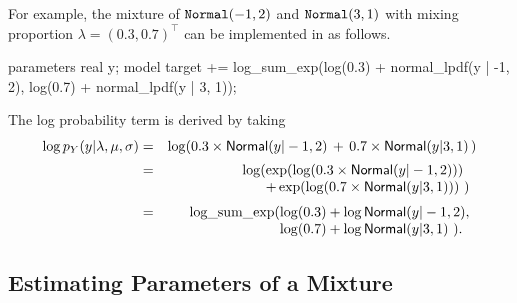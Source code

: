 For example, the mixture of $\code{Normal}(-1,2)$ and
$\code{Normal}(3,1)$ with mixing proportion $\lambda =
(0.3,0.7)^{\top}$ can be implemented in \Stan as follows.
%
\begin{stancode}
parameters {
  real y;
}
model {
  target += log_sum_exp(log(0.3) + normal_lpdf(y | -1, 2),
                        log(0.7) + normal_lpdf(y | 3, 1));
}
\end{stancode}
%
The log probability term is derived by taking
%
\begin{eqnarray*}
\log p_Y(y | \lambda,\mu,\sigma) & = & \log\!\left( 0.3 \times \distro{Normal}(y|-1,2) \, + \,
  0.7 \times
  \distro{Normal}(y|3,1) \, \right)
\\[2pt]
& = & \log(\hspace*{-5pt} \begin{array}[t]{l}
                 \exp(\log(0.3 \times \distro{Normal}(y|-1,2))) \\
                 + \exp(\log(0.7 \times \distro{Normal}(y|3,1))) \ )
              \end{array}
\\[2pt]
& = & \mbox{log\_sum\_exp}(\hspace*{-5pt}\begin{array}[t]{l}
                         \log(0.3) + \log \distro{Normal}(y|-1,2),
                         \\                  
                         \log(0.7) + \log \distro{Normal}(y|3,1) \ ).
                       \end{array}
\end{eqnarray*}
%

\subsection{Estimating Parameters of a Mixture}

